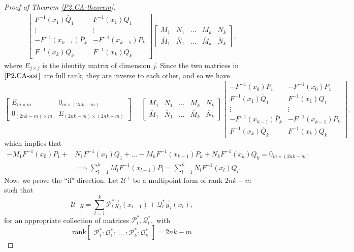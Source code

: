 \documentclass[10pt,reqno,oneside,a4paper]{article}
\begin{document}
\begin{proof}[Proof of Theorem \ref{P2.CA-theorem}]
\begin{align}
\begin{bmatrix}
F^{-1}(x_1)\overline{Q}_1 & F^{-1}(x_1) Q_1 \\
\vdots & \vdots  \\
-F^{-1}(x_{k-1})\overline{P}_k & -F^{-1}(x_{k-1})P_k \\
F^{-1}(x_{k})\overline{Q}_k & F^{-1}(x_{k})Q_k
\end{bmatrix}
\begin{bmatrix}
M_1 & N_1 & \ldots & M_k & N_k \\
\overline{M}_1  & \overline{N}_1  & \ldots & \overline{M}_k  & \overline{N}_k
\end{bmatrix}, \label{P2.CA-ast} \tag{$\ast$}
\end{align}
where $E_{j\times j}$ is the identity matrix of dimension $j.$
Since the two matrices in $\eqref{P2.CA-ast}$ are full rank, they are inverse to each other, and so we have
\[
\begin{bmatrix}
E_{m \times m} & 0_{m \times (2nk-m)} \\
0_{(2nk-m) \times m} & E_{(2nk-m) \times (2nk-m)} 
\end{bmatrix}
= 
\begin{bmatrix}
M_1 & N_1 & \ldots & M_k & N_k \\
\overline{M}_1  & \overline{N}_1  & \ldots & \overline{M}_k  & \overline{N}_k
\end{bmatrix}
\begin{bmatrix} 
- F^{-1}(x_0)\overline{P}_1 & - F^{-1}(x_0) P_1 \\
F^{-1}(x_1)\overline{Q}_1 & F^{-1}(x_1) Q_1 \\
\vdots & \vdots  \\
-F^{-1}(x_{k-1})\overline{P}_k & -F^{-1}(x_{k-1})P_k \\
F^{-1}(x_{k})\overline{Q}_k & F^{-1}(x_{k})Q_k
\end{bmatrix},
\]
which implies that 
\begin{align*}
- M_1 F^{-1}(x_0) P_1 + &N_1  F^{-1}(x_1) Q_1 + \ldots - M_k F^{-1}(x_{k-1})P_k + N_k F^{-1}(x_{k})Q_k = 0_{m \times (2nk-m)} \\
&\implies  \sum^k_{l=1} M_lF^{-1}(x_{l-1})P_l = \sum^k_{l=1} N_l F^{-1}(x_l)Q_l.
\end{align*}
Now, we prove the ``if" direction. Let $\mathcal{U}^+$ be a multipoint form of rank $2nk-m$ such that
\[ 
\mathcal{U}^+ g = \sum^k_{l=1} \mathcal{P}^*_l \vec{g}_l(x_{l-1}) + \mathcal{Q}^*_l \vec{g}_l(x_l),
\]
for an appropriate collection of matrices $\mathcal{P}^*_l, \mathcal{Q}^*_l,$ with 
\[ \mathrm{rank}\begin{bmatrix} \mathcal{P}^*_1 : \mathcal{Q}^*_1 :~ \ldots ~: \mathcal{P}^*_k : \mathcal{Q}^*_k \end{bmatrix} = 2nk-m \]

\end{proof}
\end{document}
